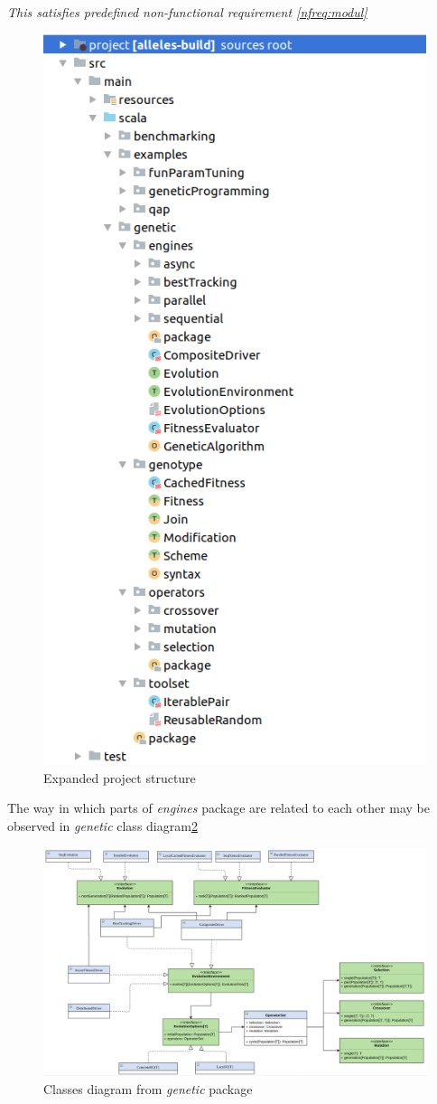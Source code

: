 \smallskip\textit{This satisfies predefined non-functional requirement \ref{nfreq:modul}}

\begin{figure}
\includegraphics[width=.7\textwidth]{img/diagrams/alleles-project-structure}
\caption{Expanded project structure}\label{diag:project-structure}
\end{figure}

\medbreak
The way in which parts of \textit{engines} package are related to each other may be observed in \textit{genetic} class diagram\ref{diag:genetic-classes}

\begin{figure}
\centering\includegraphics[width=1.\textwidth]{img/diagrams/alleles-genetic-class}
\caption{Classes diagram from \textit{genetic} package}\label{diag:genetic-classes}
\end{figure}